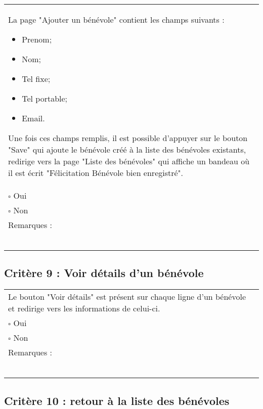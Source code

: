 	\begin{center}
    	 		\begin{tabular}[h]{|p{}|}
			\hline
				La page "Ajouter un bénévole"  contient les champs suivants : 
				\begin{itemize}
					\item Prenom;
					\item Nom;
					\item Tel fixe;
					\item Tel portable;
					\item Email.
				\end{itemize}
				Une fois ces champs remplis, il est possible d'appuyer sur le bouton "Save" qui ajoute le bénévole créé à la liste des bénévoles existants, redirige vers la page "Liste des bénévoles" qui affiche un bandeau où il est écrit "Félicitation Bénévole bien enregistré". \\
				$\square$ Oui  \\ $\square$ Non \\\hline Remarques : \\ ~\\
			 \\\hline
     		\end{tabular}
  		\end{center}	
  		
  		
  		\subsection*{Critère 9 : Voir détails d'un bénévole}
	
	\begin{center}
    	 		\begin{tabular}[h]{|p{}|}
			\hline
				Le bouton "Voir détails" est présent sur chaque ligne d'un bénévole et redirige vers les informations de celui-ci.\\
				$\square$ Oui  \\ $\square$ Non \\\hline Remarques : \\ ~\\
			 \\\hline
     		\end{tabular}
  		\end{center}	
  		
  		
  		\subsection*{Critère 10 : retour à la liste des bénévoles}
	
